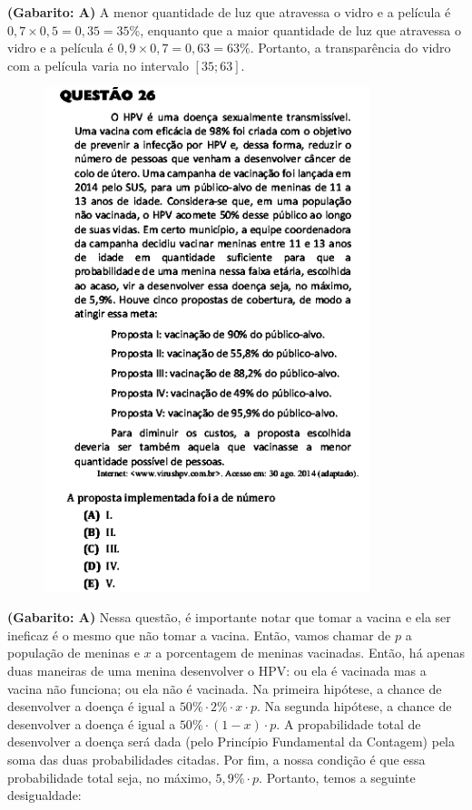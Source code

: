 \documentclass[a4paper]{article}
\begin{document}
\par\textbf{(Gabarito: A)} A menor quantidade de luz que atravessa o vidro e a película é $0,7\times 0,5 = 0,35 = 35\%$, enquanto que a maior quantidade de luz que atravessa o vidro e a película é $0,9\times 0,7 = 0,63 = 63\%$. Portanto, a transparência do vidro com a película varia no intervalo $[35;63]$.
\begin{figure}[H]
	\begin{center}
		\includegraphics[width=9.5cm]{L3Q26.png}
	\end{center}
\end{figure}
\par\textbf{(Gabarito: A)} Nessa questão, é importante notar que tomar a vacina e ela ser ineficaz é o mesmo que não tomar a vacina. Então, vamos chamar de $p$ a população de meninas e $x$ a porcentagem de meninas vacinadas. Então, há apenas duas maneiras de uma menina desenvolver o HPV: ou ela é vacinada mas a vacina não funciona; ou ela não é vacinada. Na primeira hipótese, a chance de desenvolver a doença é igual a $50\%\cdot 2\%\cdot x\cdot p$. Na segunda hipótese, a chance de desenvolver a doença é igual a $50\% \cdot (1-x)\cdot p$. A propabilidade total de desenvolver a doença será dada (pelo Princípio Fundamental da Contagem) pela soma das duas probabilidades citadas. Por fim, a nossa condição é que essa probabilidade total seja, no máximo, $5,9\%\cdot p$. Portanto, temos a seguinte desigualdade:
\end{document}
